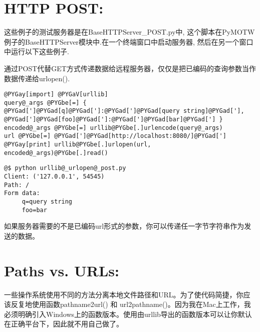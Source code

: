 \documentclass[a4paper,10pt,english]{manual}
\begin{document}
\section{HTTP POST:}

这些例子的测试服务器是在BaseHTTPServer\_POST.py中, 这个脚本在PyMOTW例子的BaseHTTPServer模块中.在一个终端窗口中启动服务器, 然后在另一个窗口中运行以下这些例子.

通过POST代替GET方式传递数据给远程服务器，仅仅是把已编码的查询参数当作数据传递给urlopen().

\begin{Verbatim}[commandchars=@\[\]]
@PYGay[import] @PYGaV[urllib]
query@_args @PYGbe[=] { @PYGad[']@PYGad[q]@PYGad[']:@PYGad[']@PYGad[query string]@PYGad['], @PYGad[']@PYGad[foo]@PYGad[']:@PYGad[']@PYGad[bar]@PYGad['] }
encoded@_args @PYGbe[=] urllib@PYGbe[.]urlencode(query@_args)
url @PYGbe[=] @PYGad[']@PYGad[http://localhost:8080/]@PYGad[']
@PYGay[print] urllib@PYGbe[.]urlopen(url, encoded@_args)@PYGbe[.]read()
\end{Verbatim}

\begin{Verbatim}[commandchars=@\[\]]
@$ python urllib@_urlopen@_post.py
Client: ('127.0.0.1', 54545)
Path: /
Form data:
     q=query string
     foo=bar
\end{Verbatim}

如果服务器需要的不是已编码url形式的参数，你可以传递任一字节字符串作为发送的数据。


\section{Paths vs. URLs:}

一些操作系统使用不同的方法分离本地文件路径和URL。为了使代码简捷，你应该反复地使用函数pathname2url() 和 url2pathname()。因为我在Mac上工作，我必须明确引入Windows上的函数版本。使用由urllib导出的函数版本可以让你默认在正确平台下，因此就不用自己做了。
\end{document}
